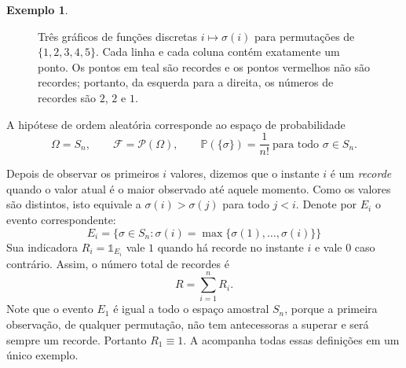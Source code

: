 \documentclass[12pt,portuguese]{article}
\theoremstyle{definition}
\newtheorem{example}[example]{Exemplo}
\begin{document}
\begin{example}
\begin{figure}[H]
\caption{Três gráficos de funções discretas $i\mapsto\sigma(i)$ para
permutações de $\{1,2,3,4,5\}$. Cada linha e cada coluna contém exatamente
um ponto. Os pontos em teal são recordes e os pontos vermelhos não são recordes;
portanto, da esquerda para a direita, os números de recordes são $2$, $2$ e
$1$.}
\label{fig:permutacoes-s5}
\end{figure}

A hipótese de ordem aleatória corresponde ao espaço de probabilidade
\[
\Omega=S_n,
\qquad
\mathcal{F}=\mathscr{P}(\Omega),
\qquad
\mathbb{P}(\{\sigma\})=\frac{1}{n!}\ \text{para todo }\sigma\in S_n.
\]

Depois de observar os primeiros $i$ valores, dizemos que o instante $i$ é um
\emph{recorde} quando o valor atual é o maior observado até aquele momento.
Como os valores são distintos, isto equivale a
$\sigma(i)>\sigma(j)$ para todo $j<i$. Denote por $E_i$ o evento correspondente:
\[
E_i=\bigl\{\sigma\in S_n:
  \sigma(i)=\max\{\sigma(1),\ldots,\sigma(i)\}\bigr\}
\]
Sua indicadora
$R_i=\mathds{1}_{E_i}$ vale $1$ quando há recorde no instante $i$ e vale $0$
caso contrário. Assim, o número total de recordes é
\[
R=\sum_{i=1}^n R_i.
\]
Note que o evento $E_1$ é igual a todo o espaço amostral $S_n$,
porque a primeira observação, de qualquer permutação,
não tem antecessoras a superar e será sempre um recorde.
Portanto $R_1\equiv 1$. A 
acompanha todas essas definições em um único exemplo.


\end{example}
\end{document}

